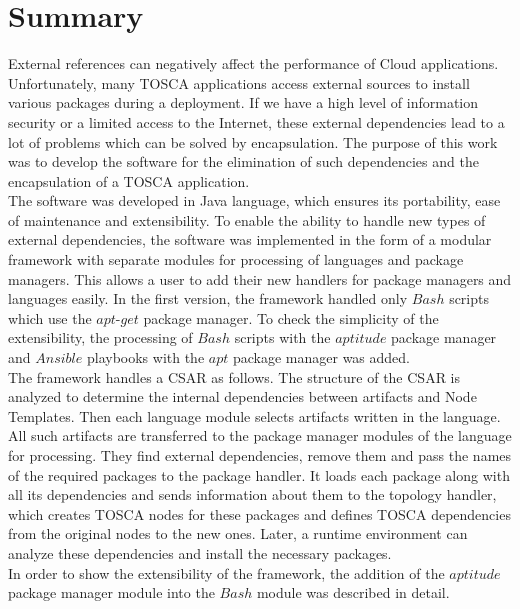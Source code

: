 
\chapter{Summary}\label{chap:zusfas}
External references can negatively affect the performance of Cloud applications.
Unfortunately, many TOSCA applications access external sources to install various packages during a deployment.
If we have a high level of information security or a limited access to the Internet, these external dependencies lead to a lot of problems which can be solved by encapsulation.
The purpose of this work was to develop the software for the elimination of such dependencies and the encapsulation of a TOSCA application.\\
The software was developed in Java language, which ensures its portability, ease of maintenance and extensibility.
To enable the ability to handle new types of external dependencies, the software was implemented in the form of a modular framework with separate modules for processing of languages and package managers.
This allows a user to add their new handlers for package managers and languages easily.
In the first version, the framework handled only $Bash$ scripts  which use the $apt$-$get$ package manager.
To check the simplicity of the extensibility, the processing of $Bash$ scripts with the $aptitude$ package manager and  $Ansible$ playbooks with the $apt$ package manager was added.\\
The framework handles a CSAR as follows.
The structure of the CSAR is analyzed to determine the internal dependencies between artifacts and Node Templates.
Then each language module selects artifacts written in the language.
All such artifacts are transferred to the package manager modules of the language for processing.
They find external dependencies, remove them and pass the names of the required packages to the package handler.
It loads each package along with all its dependencies and sends information about them to the topology handler, which creates TOSCA nodes for these packages and defines TOSCA dependencies from the original nodes to the new ones.
Later, a runtime environment can analyze these dependencies and install the necessary packages.\\
In order to show the extensibility of the framework, the addition of the $aptitude$ package manager module into the $Bash$ module was described in detail.
